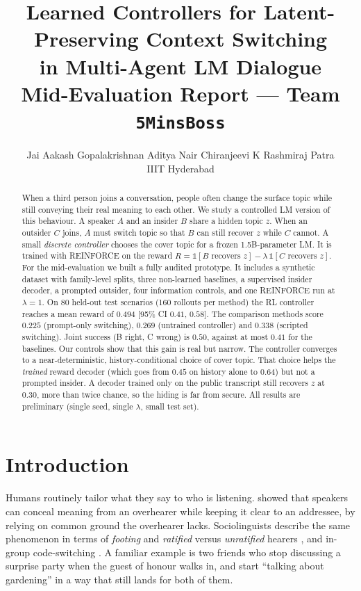 \documentclass[10pt,a4paper,twocolumn]{article}
\title{\vspace{-1.2em}\textbf{Learned Controllers for Latent-Preserving Context Switching\\in Multi-Agent LM Dialogue}\\[2pt]
\large Mid-Evaluation Report --- Team \texttt{5MinsBoss}}
\author{Jai Aakash Gopalakrishnan \quad Aditya Nair \quad Chiranjeevi K \quad Rashmiraj Patra\\
IIIT Hyderabad}
\date{\vspace{-1.5em}}
\newcommand{\1}{\mathbb{1}}
\begin{document}
\maketitle

\begin{abstract}
When a third person joins a conversation, people often change the surface topic while still conveying their real meaning to each other. We study a controlled LM version of this behaviour. A speaker $A$ and an insider $B$ share a hidden topic $z$. When an outsider $C$ joins, $A$ must switch topic so that $B$ can still recover $z$ while $C$ cannot. A small \emph{discrete controller} chooses the cover topic for a frozen 1.5B-parameter LM. It is trained with REINFORCE on the reward $R=\1[B\text{ recovers }z]-\lambda\,\1[C\text{ recovers }z]$.
For the mid-evaluation we built a fully audited prototype. It includes a synthetic dataset with family-level splits, three non-learned baselines, a supervised insider decoder, a prompted outsider, four information controls, and one REINFORCE run at $\lambda=1$.
On 80 held-out test scenarios (160 rollouts per method) the RL controller reaches a mean reward of $0.494$ [95\% CI $0.41$, $0.58$]. The comparison methods score $0.225$ (prompt-only switching), $0.269$ (untrained controller) and $0.338$ (scripted switching). Joint success (B right, C wrong) is $0.50$, against at most $0.41$ for the baselines.
Our controls show that this gain is real but narrow. The controller converges to a near-deterministic, history-conditional choice of cover topic. That choice helps the \emph{trained} reward decoder (which goes from $0.45$ on history alone to $0.64$) but not a prompted insider. A decoder trained only on the public transcript still recovers $z$ at $0.30$, more than twice chance, so the hiding is far from secure. All results are preliminary (single seed, single $\lambda$, small test set).
\end{abstract}

\section{Introduction}
Humans routinely tailor what they say to who is listening. \citet{clark1987concealing} showed that speakers can conceal meaning from an overhearer while keeping it clear to an addressee, by relying on common ground the overhearer lacks. Sociolinguists describe the same phenomenon in terms of \emph{footing} and \emph{ratified} versus \emph{unratified} hearers \citep{goffman1981forms}, and in-group code-switching \citep{gumperz1982discourse}. A familiar example is two friends who stop discussing a surprise party when the guest of honour walks in, and start ``talking about gardening'' in a way that still lands for both of them.
\end{document}
